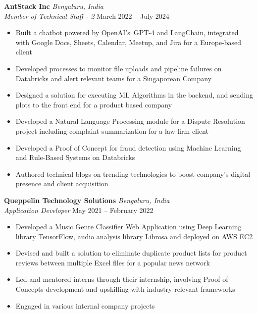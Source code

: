 \documentclass[11pt,a4paper]{article}
\begin{document}
\vspace{1em}
\noindent\textbf{AntStack Inc} \hfill \textit{Bengaluru, India}\\
\textit{Member of Technical Staff - 2} \hfill March 2022 – July 2024
\begin{itemize}[noitemsep,topsep=2pt]
    \item Built a chatbot powered by \mbox{OpenAI's GPT-4} and \mbox{LangChain}, integrated with Google Docs, Sheets, Calendar, Meetup, and Jira for a \mbox{Europe-based} client
    \item Developed processes to monitor file uploads and pipeline failures on Databricks and alert relevant teams for a Singaporean Company
    \item Designed a solution for executing ML Algorithms in the backend, and sending plots to the front end for a product based company
    \item Developed a Natural Language Processing module for a Dispute Resolution project including complaint summarization for a law firm client
    \item Developed a Proof of Concept for fraud detection using Machine Learning and Rule-Based Systems on Databricks
    \item Authored technical blogs on trending technologies to boost company's digital presence and client acquisition
\end{itemize}
\vspace{-0.3em}

\vspace{1em}
\noindent\textbf{Queppelin Technology Solutions} \hfill \textit{Bengaluru, India}\\
\textit{Application Developer} \hfill May 2021 – February 2022
\begin{itemize}[noitemsep,topsep=2pt]
    \item Developed a Music Genre Classifier Web Application using Deep Learning library TensorFlow, audio analysis library Librosa and deployed on AWS EC2
    \item Devised and built a solution to eliminate duplicate product lists for product reviews between multiple Excel files for a popular news network
    \item Led and mentored interns through their internship, involving Proof of Concepts development and upskilling with industry relevant frameworks
    \item Engaged in various internal company projects
\end{itemize}
\vspace{-0.3em}
\end{document}
